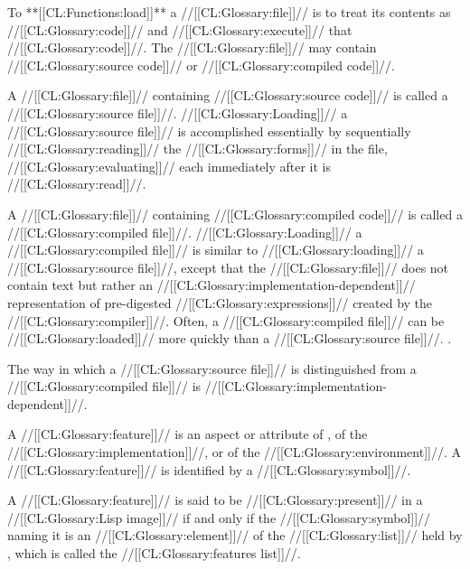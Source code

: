 


To **[[CL:Functions:load]]** a //[[CL:Glossary:file]]// is to treat its contents as //[[CL:Glossary:code]]// and //[[CL:Glossary:execute]]// that //[[CL:Glossary:code]]//. The //[[CL:Glossary:file]]// may contain //[[CL:Glossary:source code]]// or //[[CL:Glossary:compiled code]]//.

A //[[CL:Glossary:file]]// containing //[[CL:Glossary:source code]]// is called a //[[CL:Glossary:source file]]//. //[[CL:Glossary:Loading]]// a //[[CL:Glossary:source file]]// is accomplished essentially  by sequentially //[[CL:Glossary:reading]]// the //[[CL:Glossary:forms]]// in the file, //[[CL:Glossary:evaluating]]// each immediately after it is //[[CL:Glossary:read]]//.

A //[[CL:Glossary:file]]// containing //[[CL:Glossary:compiled code]]// is called a //[[CL:Glossary:compiled file]]//. //[[CL:Glossary:Loading]]// a //[[CL:Glossary:compiled file]]// is similar to //[[CL:Glossary:loading]]// a //[[CL:Glossary:source file]]//, except that the //[[CL:Glossary:file]]// does not contain text but rather an //[[CL:Glossary:implementation-dependent]]// representation of pre-digested //[[CL:Glossary:expressions]]// created by the //[[CL:Glossary:compiler]]//.  Often, a //[[CL:Glossary:compiled file]]// can be //[[CL:Glossary:loaded]]// more quickly than a //[[CL:Glossary:source file]]//. \Seesection\Compilation.

The way in which a //[[CL:Glossary:source file]]// is distinguished from a //[[CL:Glossary:compiled file]]//  is //[[CL:Glossary:implementation-dependent]]//.

\endsubsection%

 

A //[[CL:Glossary:feature]]// is an aspect or attribute
     of \clisp, 
     of the //[[CL:Glossary:implementation]]//,
  or of the //[[CL:Glossary:environment]]//. A //[[CL:Glossary:feature]]// is identified by a //[[CL:Glossary:symbol]]//.

A //[[CL:Glossary:feature]]// is said to be //[[CL:Glossary:present]]// in a //[[CL:Glossary:Lisp image]]// if and only if the //[[CL:Glossary:symbol]]// naming it is an //[[CL:Glossary:element]]// of the //[[CL:Glossary:list]]// held by ,  which is called the //[[CL:Glossary:features list]]//.

 

